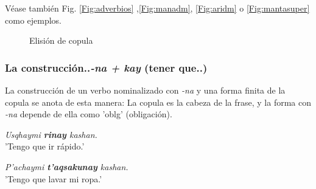 \documentclass[a4paper,11pt,DIV12]{scrartcl}
\begin{document}
V\'ease tambi\'en Fig. \ref{Fig:adverbios} ,\ref{Fig:manadm}, \ref{Fig:aridm} o \ref{Fig:mantasuper} como ejemplos.

\begin{figure}
 \begin{center}
 \end{center}
\caption{Elisi\'on de copula}\label{Fig:KAN}
\end{figure}



\subsubsection{La construcci\'on..{\em -na + kay} (tener que..)}\label{Sec:nakay}

La construcci\'on de un verbo nominalizado con {\em -na} y una forma finita de la copula se anota de esta manera:
La copula es la cabeza de la frase, y la forma con {\em -na} depende de ella como 'oblg' (obligaci\'on).

\begin{examples}
 \item {\em Usqhaymi \textbf{rinay} kashan.}\\
      'Tengo que ir r\'apido.'
 \item\label{Ex:nakay} {\em P'achaymi \textbf{t'aqsakunay} kashan.}\\
      'Tengo que lavar mi ropa.'\\
 	\hfill{\small \citep[210]{Cusi2}}
\end{examples}
\end{document}
